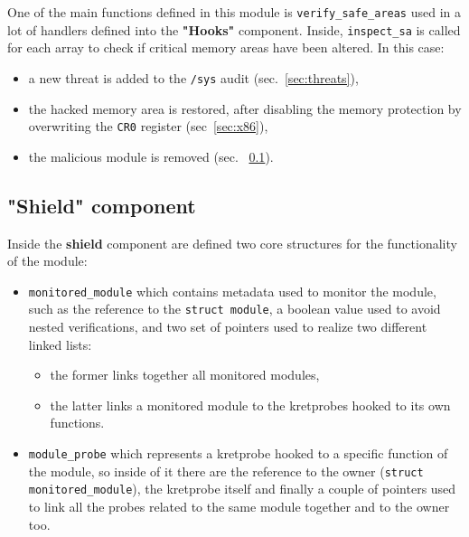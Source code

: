 \documentclass{article}
\begin{document}
	

	One of the main functions defined in this module is \texttt{verify\_safe\_areas} used in a lot of handlers defined
	into the \textbf{"Hooks"} component. Inside, \texttt{inspect\_sa} is called for each array to check if critical
	memory areas have been altered. In this case:

	\begin{itemize}
		\item a new threat is added to the \texttt{/sys} audit (sec.~\ref{sec:threats}),
		\item the hacked memory area is restored, after disabling the memory protection by overwriting the \texttt{CR0}
		register (sec~\ref{sec:x86}),
		\item the malicious module is removed (sec. ~\ref{sec:shield}).
	\end{itemize}

	\subsection{"Shield" component}\label{sec:shield}
	Inside the \textbf{shield} component are defined two core structures for the functionality of the module:
	\begin{itemize}
		\item \texttt{monitored\_module} which contains metadata used to monitor the module, such as the reference to
		the \texttt{struct module}, a boolean value used to avoid nested verifications, and two set of pointers used to
		realize two different linked lists:
		\begin{itemize}
			\item the former links together all monitored modules,
			\item the latter links a monitored module to the kretprobes hooked to its own functions.
		\end{itemize}

		\item \texttt{module\_probe} which represents a kretprobe hooked to a specific function of the module, so
		inside of it there are the reference to the owner (\texttt{struct monitored\_module}), the kretprobe itself and
		finally a couple of pointers used to link all the probes related to the same module together and to the owner
		too.
	\end{itemize}
\end{document}
